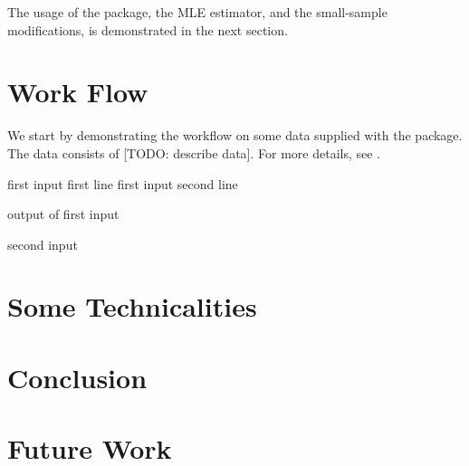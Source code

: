 \documentclass[article]{jss}
\begin{document}
The usage of the package, the MLE estimator, and the small-sample modifications, is demonstrated in the next section.



\section{Work Flow}

We start by demonstrating the workflow on some data supplied with the package. 
The data consists of [TODO: describe data].
For more details, see \citet{salganik_assessing_2011}. 


\begin{CodeChunk}
\begin{CodeInput}
first input first line
first input second line
\end{CodeInput}
\begin{CodeOutput}
output of first input
\end{CodeOutput}
\begin{CodeInput}
second input
\end{CodeInput}
\end{CodeChunk}




\section{Some Technicalities}


\section{Conclusion}


\section{Future Work}




\end{document}
